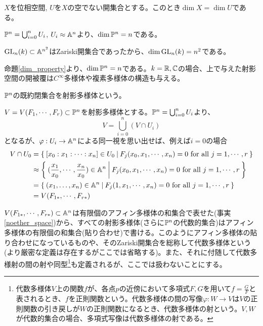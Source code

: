 \documentclass{ltjsreport}
\begin{document}
\begin{fact}[\cite{RH}]\label{dim_property}
  $X$を位相空間, $U$を$X$の空でない開集合とする。このとき$\dim X=\dim U$である。
\end{fact}


\begin{eg}
  $\mathbb{P}^n=\bigcup_{i=0}^nU_i$, $U_i\approx \mathbb{A}^n$より、$\dim\mathbb{P}^n=n$である。
\end{eg}

\begin{eg}
  $\text{GL}_n(k)\subset\mathbb{A}^{n^2}$はZariski開集合であったから、$\dim\text{GL}_n(k)=n^2$である。
\end{eg}

命題\ref{dim_property}より、$\dim \mathbb{P}^n=n$である。$k=\mathbb{R},\mathbb{C}$の場合、上で与えた射影空間の開被覆は$C^\infty$多様体や複素多様体の構造も与える。

\begin{defin}
  $\mathbb{P}^n$の既約閉集合を射影多様体という。
\end{defin}

$V=V(F_1,\cdots,F_r)\subset\mathbb{P}^n$を射影多様体とする。$\mathbb{P}^n=\bigcup_{i=0}^nU_i$より、
\[
V=\bigcup_{i=0}^n(V\cap U_i)
\]
となるが、$\varphi:U_i\rightarrow \mathbb{A}^n$による同一視を思い出せば、例えば$i=0$の場合
\begin{align*}
V\cap U_0
&=\left\{\:[x_0:x_1:\cdots:x_n]\in U_0\:\middle|\:F_j(x_0,x_1,\cdots,x_n)=0\text{ for all $j=1,\cdots,r$}\:\right\}\\
&\approx \left\{\:(\frac{x_1}{x_0},\cdots,\frac{x_n}{x_0})\in\mathbb{A}^n\:\middle|\:F_j(x_0,x_1,\cdots,x_n)=0\text{ for all $j=1,\cdots,r$}\:\right\}\\
&=\left\{\:(x_1,\dots,x_n)\in\mathbb{A}^n\:\middle|\:F_j(1,x_1,\cdots,x_n)=0\text{ for all $j=1,\cdots,r$}\:\right\}\\
&=V(F_{1*},\cdots,F_{r*})
\end{align*}

$V(F_{1*},\cdots,F_{r*})\subset\mathbb{A}^n$は有限個のアフィン多様体の和集合で表せた(事実\ref{noether_space})から、すべての射影多様体(さらに$\mathbb{P}^n$の代数的集合)はアフィン多様体の有限個の和集合(貼り合わせ)で書ける。このようにアフィン多様体の貼り合わせになっているものや、そのZariski開集合を総称して代数多様体という(より厳密な定義は存在するがここでは省略する)。また、それに付随して代数多様射の間の射や同型\footnote{
  代数多様体$V$上の関数$f$が、各点$p$の近傍において多項式$F,G$を用いて$f=\frac{G}{F}$と表されるとき、$f$を正則関数という。代数多様体の間の写像$\varphi:W\rightarrow V$は$V$の正則関数の引き戻しが$W$の正則関数になるとき、代数多様体の射という。$V,W$が代数的集合の場合、多項式写像は代数多様体の射である。
}も定義されるが、ここでは扱わないことにする。
\end{document}
